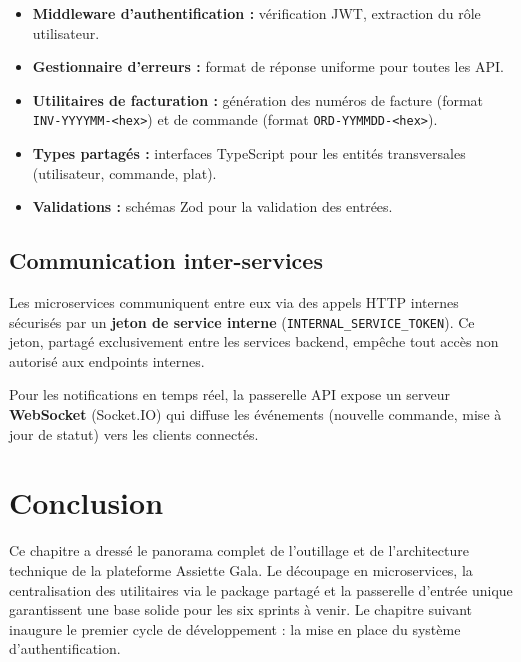 \begin{itemize}
    \item \textbf{Middleware d'authentification :} vérification JWT, extraction du rôle utilisateur.
    \item \textbf{Gestionnaire d'erreurs :} format de réponse uniforme pour toutes les API.
    \item \textbf{Utilitaires de facturation :} génération des numéros de facture (format \texttt{INV-YYYYMM-<hex>}) et de commande (format \texttt{ORD-YYMMDD-<hex>}).
    \item \textbf{Types partagés :} interfaces TypeScript pour les entités transversales (utilisateur, commande, plat).
    \item \textbf{Validations :} schémas Zod pour la validation des entrées.
\end{itemize}

\subsection{Communication inter-services}

Les microservices communiquent entre eux via des appels HTTP internes sécurisés par un \textbf{jeton de service interne} (\texttt{INTERNAL\_SERVICE\_TOKEN}). Ce jeton, partagé exclusivement entre les services backend, empêche tout accès non autorisé aux endpoints internes.

Pour les notifications en temps réel, la passerelle API expose un serveur \textbf{WebSocket} (Socket.IO) qui diffuse les événements (nouvelle commande, mise à jour de statut) vers les clients connectés.

\section*{Conclusion}

\begin{samepage}
Ce chapitre a dressé le panorama complet de l'outillage et de l'architecture technique de la plateforme Assiette Gala. Le découpage en microservices, la centralisation des utilitaires via le package partagé et la passerelle d'entrée unique garantissent une base solide pour les six sprints à venir. Le chapitre suivant inaugure le premier cycle de développement : la mise en place du système d'authentification.
\end{samepage}

